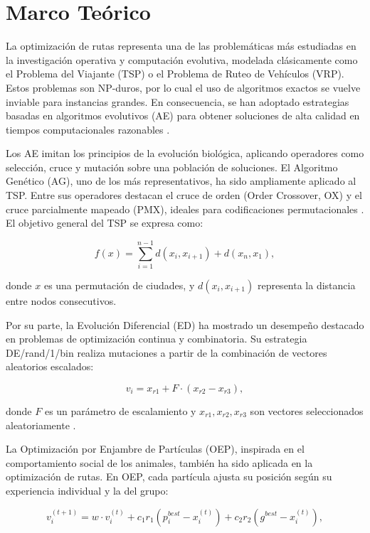 \documentclass[10pt,a4paper]{article}
\begin{document}
\section{Marco Teórico}

La optimización de rutas representa una de las problemáticas más estudiadas en la investigación operativa y computación evolutiva, modelada clásicamente como el Problema del Viajante (TSP) o el Problema de Ruteo de Vehículos (VRP). Estos problemas son NP-duros, por lo cual el uso de algoritmos exactos se vuelve inviable para instancias grandes. En consecuencia, se han adoptado estrategias basadas en algoritmos evolutivos (AE) para obtener soluciones de alta calidad en tiempos computacionales razonables \cite{eiben2003}.

Los AE imitan los principios de la evolución biológica, aplicando operadores como selección, cruce y mutación sobre una población de soluciones. El Algoritmo Genético (AG), uno de los más representativos, ha sido ampliamente aplicado al TSP. Entre sus operadores destacan el cruce de orden (Order Crossover, OX) y el cruce parcialmente mapeado (PMX), ideales para codificaciones permutacionales \cite{syswerda1989}. El objetivo general del TSP se expresa como:

\begin{equation}
f(x) = \sum_{i=1}^{n-1} d(x_i, x_{i+1}) + d(x_n, x_1),
\end{equation}

donde $x$ es una permutación de ciudades, y $d(x_i, x_{i+1})$ representa la distancia entre nodos consecutivos.

Por su parte, la Evolución Diferencial (ED) ha mostrado un desempeño destacado en problemas de optimización continua y combinatoria. Su estrategia DE/rand/1/bin realiza mutaciones a partir de la combinación de vectores aleatorios escalados:

\begin{equation}
v_i = x_{r1} + F \cdot (x_{r2} - x_{r3}),
\end{equation}

donde $F$ es un parámetro de escalamiento y $x_{r1}, x_{r2}, x_{r3}$ son vectores seleccionados aleatoriamente \cite{das2011}.

La Optimización por Enjambre de Partículas (OEP), inspirada en el comportamiento social de los animales, también ha sido aplicada en la optimización de rutas. En OEP, cada partícula ajusta su posición según su experiencia individual y la del grupo:

\begin{equation}
v_i^{(t+1)} = w \cdot v_i^{(t)} + c_1 r_1 (p_i^{best} - x_i^{(t)}) + c_2 r_2 (g^{best} - x_i^{(t)}),
\end{equation}
\end{document}
